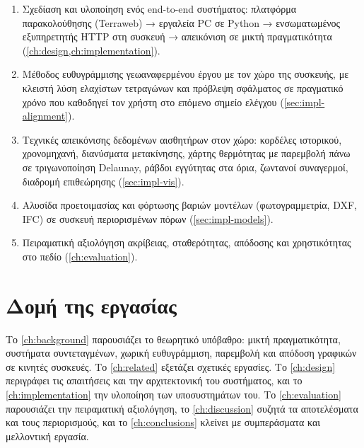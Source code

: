 \begin{enumerate}
  \item Σχεδίαση και υλοποίηση ενός end-to-end συστήματος: πλατφόρμα παρακολούθησης (Terraweb) → εργαλεία PC σε Python → ενσωματωμένος εξυπηρετητής HTTP στη συσκευή → απεικόνιση σε μικτή πραγματικότητα (\cref{ch:design,ch:implementation}).
  \item Μέθοδος ευθυγράμμισης γεωαναφερμένου έργου με τον χώρο της συσκευής, με κλειστή λύση ελαχίστων τετραγώνων και πρόβλεψη σφάλματος σε πραγματικό χρόνο που καθοδηγεί τον χρήστη στο επόμενο σημείο ελέγχου (\cref{sec:impl-alignment}).
  \item Τεχνικές απεικόνισης δεδομένων αισθητήρων στον χώρο: κορδέλες ιστορικού, χρονομηχανή, διανύσματα μετακίνησης, χάρτης θερμότητας με παρεμβολή πάνω σε τριγωνοποίηση Delaunay, ράβδοι εγγύτητας στα όρια, ζωντανοί συναγερμοί, διαδρομή επιθεώρησης (\cref{sec:impl-vis}).
  \item Αλυσίδα προετοιμασίας και φόρτωσης βαριών μοντέλων (φωτογραμμετρία, DXF, IFC) σε συσκευή περιορισμένων πόρων (\cref{sec:impl-models}).
  \item Πειραματική αξιολόγηση ακρίβειας, σταθερότητας, απόδοσης και χρηστικότητας στο πεδίο (\cref{ch:evaluation}).
\end{enumerate}


\section{Δομή της εργασίας}
\label{sec:outline}

Το \cref{ch:background} παρουσιάζει το θεωρητικό υπόβαθρο: μικτή πραγματικότητα, συστήματα συντεταγμένων, χωρική ευθυγράμμιση, παρεμβολή και απόδοση γραφικών σε κινητές συσκευές. Το \cref{ch:related} εξετάζει σχετικές εργασίες. Το \cref{ch:design} περιγράφει τις απαιτήσεις και την αρχιτεκτονική του συστήματος, και το \cref{ch:implementation} την υλοποίηση των υποσυστημάτων του. Το \cref{ch:evaluation} παρουσιάζει την πειραματική αξιολόγηση, το \cref{ch:discussion} συζητά τα αποτελέσματα και τους περιορισμούς, και το \cref{ch:conclusions} κλείνει με συμπεράσματα και μελλοντική εργασία.
